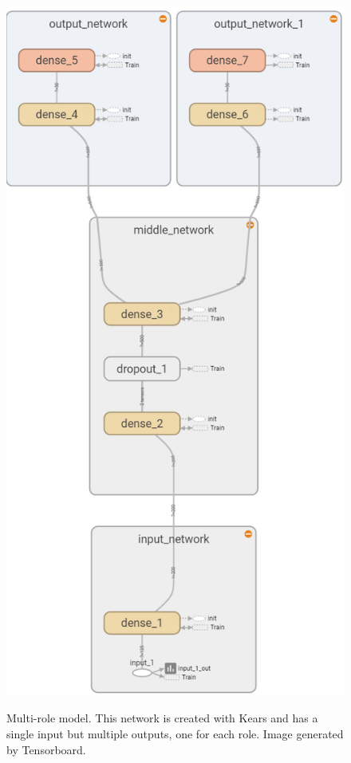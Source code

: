 \documentclass[twocolumn, letterpaper, 10 pt, conference]{ieeeconf}  %
\begin{document}
\begin{figure}[H]
    \centering
    \caption{Multi-role model. This network is created with Kears and has a single input but multiple outputs, one for each role. Image generated by Tensorboard. }
    \includegraphics[scale=0.74]{Images/multiple_roles_expanded.png}
    \label{fig:multi_role_model}
\end{figure}
\end{document}
